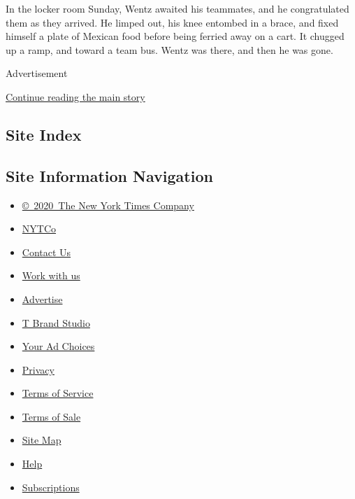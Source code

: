In the locker room Sunday, Wentz awaited his teammates, and he
congratulated them as they arrived. He limped out, his knee entombed in
a brace, and fixed himself a plate of Mexican food before being ferried
away on a cart. It chugged up a ramp, and toward a team bus. Wentz was
there, and then he was gone.

Advertisement

\protect\hyperlink{after-bottom}{Continue reading the main story}

\hypertarget{site-index}{%
\subsection{Site Index}\label{site-index}}

\hypertarget{site-information-navigation}{%
\subsection{Site Information
Navigation}\label{site-information-navigation}}

\begin{itemize}
\tightlist
\item
  \href{https://help.nytimes3xbfgragh.onion/hc/en-us/articles/115014792127-Copyright-notice}{©~2020~The
  New York Times Company}
\end{itemize}

\begin{itemize}
\tightlist
\item
  \href{https://www.nytco.com/}{NYTCo}
\item
  \href{https://help.nytimes3xbfgragh.onion/hc/en-us/articles/115015385887-Contact-Us}{Contact
  Us}
\item
  \href{https://www.nytco.com/careers/}{Work with us}
\item
  \href{https://nytmediakit.com/}{Advertise}
\item
  \href{http://www.tbrandstudio.com/}{T Brand Studio}
\item
  \href{https://www.nytimes3xbfgragh.onion/privacy/cookie-policy\#how-do-i-manage-trackers}{Your
  Ad Choices}
\item
  \href{https://www.nytimes3xbfgragh.onion/privacy}{Privacy}
\item
  \href{https://help.nytimes3xbfgragh.onion/hc/en-us/articles/115014893428-Terms-of-service}{Terms
  of Service}
\item
  \href{https://help.nytimes3xbfgragh.onion/hc/en-us/articles/115014893968-Terms-of-sale}{Terms
  of Sale}
\item
  \href{https://spiderbites.nytimes3xbfgragh.onion}{Site Map}
\item
  \href{https://help.nytimes3xbfgragh.onion/hc/en-us}{Help}
\item
  \href{https://www.nytimes3xbfgragh.onion/subscription?campaignId=37WXW}{Subscriptions}
\end{itemize}
